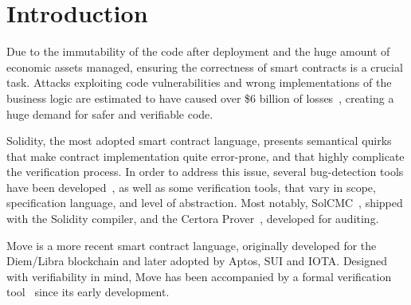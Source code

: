 

\section{Introduction}

Due to the immutability of the code after deployment 
and the huge amount of economic assets managed, ensuring the correctness of smart contracts is a crucial task.
Attacks exploiting code vulnerabilities and wrong implementations of the business logic are estimated to have caused  over \$6 billion of losses~\cite{Chaliasos24icse}, creating
a huge demand for safer and verifiable code. 

Solidity, the most adopted smart contract language, %
presents  semantical quirks that make contract implementation quite error-prone, and that highly complicate the verification process. 
In order to address this issue, several bug-detection tools have been developed~\cite{Tolmach22csur}, as well as some verification tools, that vary in scope, specification language, and level of abstraction. Most notably, SolCMC~\cite{Solcmc}, shipped with the Solidity compiler,
and the Certora Prover~\cite{certora}, developed for auditing.

Move is a more recent smart contract language, originally developed for the Diem/Libra blockchain  
and later adopted by Aptos, SUI and IOTA.
Designed with verifiability in mind, Move has been accompanied by a formal verification tool~\cite{Zhong20cav} since its early development.

